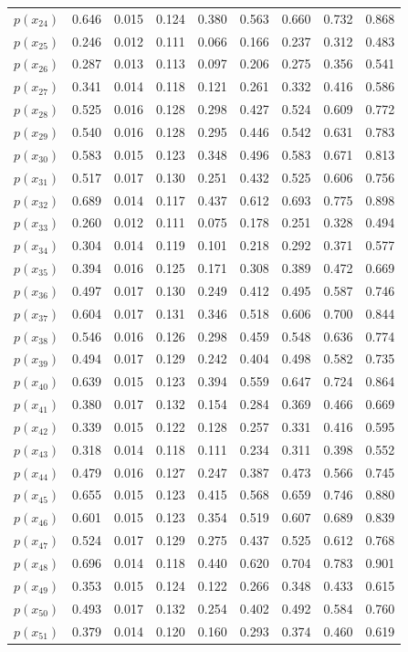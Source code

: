 \documentclass[12pt,a4paper,UTF8,twoside]{book}
\theoremstyle{definition}
\theoremstyle{definition}
\theoremstyle{definition}
\theoremstyle{remark}
\begin{document}
\begin{longtable}[]{@{}lrrrrrrrr@{}}
\(p(x_{24})\) & 0.646 & 0.015 & 0.124 & 0.380 & 0.563 & 0.660 & 0.732 & 0.868\tabularnewline
\(p(x_{25})\) & 0.246 & 0.012 & 0.111 & 0.066 & 0.166 & 0.237 & 0.312 & 0.483\tabularnewline
\(p(x_{26})\) & 0.287 & 0.013 & 0.113 & 0.097 & 0.206 & 0.275 & 0.356 & 0.541\tabularnewline
\(p(x_{27})\) & 0.341 & 0.014 & 0.118 & 0.121 & 0.261 & 0.332 & 0.416 & 0.586\tabularnewline
\(p(x_{28})\) & 0.525 & 0.016 & 0.128 & 0.298 & 0.427 & 0.524 & 0.609 & 0.772\tabularnewline
\(p(x_{29})\) & 0.540 & 0.016 & 0.128 & 0.295 & 0.446 & 0.542 & 0.631 & 0.783\tabularnewline
\(p(x_{30})\) & 0.583 & 0.015 & 0.123 & 0.348 & 0.496 & 0.583 & 0.671 & 0.813\tabularnewline
\(p(x_{31})\) & 0.517 & 0.017 & 0.130 & 0.251 & 0.432 & 0.525 & 0.606 & 0.756\tabularnewline
\(p(x_{32})\) & 0.689 & 0.014 & 0.117 & 0.437 & 0.612 & 0.693 & 0.775 & 0.898\tabularnewline
\(p(x_{33})\) & 0.260 & 0.012 & 0.111 & 0.075 & 0.178 & 0.251 & 0.328 & 0.494\tabularnewline
\(p(x_{34})\) & 0.304 & 0.014 & 0.119 & 0.101 & 0.218 & 0.292 & 0.371 & 0.577\tabularnewline
\(p(x_{35})\) & 0.394 & 0.016 & 0.125 & 0.171 & 0.308 & 0.389 & 0.472 & 0.669\tabularnewline
\(p(x_{36})\) & 0.497 & 0.017 & 0.130 & 0.249 & 0.412 & 0.495 & 0.587 & 0.746\tabularnewline
\(p(x_{37})\) & 0.604 & 0.017 & 0.131 & 0.346 & 0.518 & 0.606 & 0.700 & 0.844\tabularnewline
\(p(x_{38})\) & 0.546 & 0.016 & 0.126 & 0.298 & 0.459 & 0.548 & 0.636 & 0.774\tabularnewline
\(p(x_{39})\) & 0.494 & 0.017 & 0.129 & 0.242 & 0.404 & 0.498 & 0.582 & 0.735\tabularnewline
\(p(x_{40})\) & 0.639 & 0.015 & 0.123 & 0.394 & 0.559 & 0.647 & 0.724 & 0.864\tabularnewline
\(p(x_{41})\) & 0.380 & 0.017 & 0.132 & 0.154 & 0.284 & 0.369 & 0.466 & 0.669\tabularnewline
\(p(x_{42})\) & 0.339 & 0.015 & 0.122 & 0.128 & 0.257 & 0.331 & 0.416 & 0.595\tabularnewline
\(p(x_{43})\) & 0.318 & 0.014 & 0.118 & 0.111 & 0.234 & 0.311 & 0.398 & 0.552\tabularnewline
\(p(x_{44})\) & 0.479 & 0.016 & 0.127 & 0.247 & 0.387 & 0.473 & 0.566 & 0.745\tabularnewline
\(p(x_{45})\) & 0.655 & 0.015 & 0.123 & 0.415 & 0.568 & 0.659 & 0.746 & 0.880\tabularnewline
\(p(x_{46})\) & 0.601 & 0.015 & 0.123 & 0.354 & 0.519 & 0.607 & 0.689 & 0.839\tabularnewline
\(p(x_{47})\) & 0.524 & 0.017 & 0.129 & 0.275 & 0.437 & 0.525 & 0.612 & 0.768\tabularnewline
\(p(x_{48})\) & 0.696 & 0.014 & 0.118 & 0.440 & 0.620 & 0.704 & 0.783 & 0.901\tabularnewline
\(p(x_{49})\) & 0.353 & 0.015 & 0.124 & 0.122 & 0.266 & 0.348 & 0.433 & 0.615\tabularnewline
\(p(x_{50})\) & 0.493 & 0.017 & 0.132 & 0.254 & 0.402 & 0.492 & 0.584 & 0.760\tabularnewline
\(p(x_{51})\) & 0.379 & 0.014 & 0.120 & 0.160 & 0.293 & 0.374 & 0.460 & 0.619\tabularnewline

\end{longtable}
\end{document}
